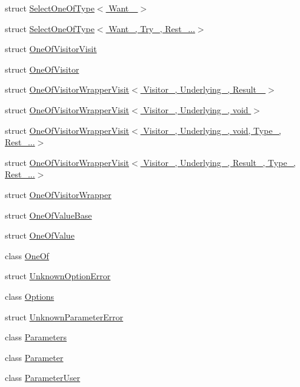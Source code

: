 \begin{DoxyCompactItemize}
\item 
struct \hyperlink{structeos_1_1SelectOneOfType_3_01Want___01_4}{SelectOneOfType$<$ Want\_\- $>$}
\item 
struct \hyperlink{structeos_1_1SelectOneOfType_3_01Want___00_01Try___00_01Rest___8_8_8_4}{SelectOneOfType$<$ Want\_\-, Try\_\-, Rest\_\-...$>$}
\item 
struct \hyperlink{structeos_1_1OneOfVisitorVisit}{OneOfVisitorVisit}
\item 
struct \hyperlink{structeos_1_1OneOfVisitor}{OneOfVisitor}
\item 
struct \hyperlink{structeos_1_1OneOfVisitorWrapperVisit_3_01Visitor___00_01Underlying___00_01Result___01_4}{OneOfVisitorWrapperVisit$<$ Visitor\_\-, Underlying\_\-, Result\_\- $>$}
\item 
struct \hyperlink{structeos_1_1OneOfVisitorWrapperVisit_3_01Visitor___00_01Underlying___00_01void_01_4}{OneOfVisitorWrapperVisit$<$ Visitor\_\-, Underlying\_\-, void $>$}
\item 
struct \hyperlink{structeos_1_1OneOfVisitorWrapperVisit_3_01Visitor___00_01Underlying___00_01void_00_01Type___00_01Rest___8_8_8_4}{OneOfVisitorWrapperVisit$<$ Visitor\_\-, Underlying\_\-, void, Type\_\-, Rest\_\-...$>$}
\item 
struct \hyperlink{structeos_1_1OneOfVisitorWrapperVisit_3_01Visitor___00_01Underlying___00_01Result___00_01Type___00_01Rest___8_8_8_4}{OneOfVisitorWrapperVisit$<$ Visitor\_\-, Underlying\_\-, Result\_\-, Type\_\-, Rest\_\-...$>$}
\item 
struct \hyperlink{structeos_1_1OneOfVisitorWrapper}{OneOfVisitorWrapper}
\item 
struct \hyperlink{structeos_1_1OneOfValueBase}{OneOfValueBase}
\item 
struct \hyperlink{structeos_1_1OneOfValue}{OneOfValue}
\item 
class \hyperlink{classeos_1_1OneOf}{OneOf}
\item 
struct \hyperlink{structeos_1_1UnknownOptionError}{UnknownOptionError}
\item 
class \hyperlink{classeos_1_1Options}{Options}
\item 
struct \hyperlink{structeos_1_1UnknownParameterError}{UnknownParameterError}
\item 
class \hyperlink{classeos_1_1Parameters}{Parameters}
\item 
class \hyperlink{classeos_1_1Parameter}{Parameter}
\item 
class \hyperlink{classeos_1_1ParameterUser}{ParameterUser}

\end{DoxyCompactItemize}
